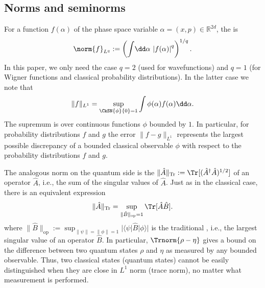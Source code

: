 \documentclass{article}
\numberwithin{equation}{section}
\begin{document}
\subsection{Norms and seminorms}\label{sec:norms}



For a function $f(\alpha)$ of the phase space variable $\alpha = (x,p) \in \mathbb{R}^{2d}$, the  is
\begin{align}
    \norm{f}_{L^q} := \left( \int \!\dd \alpha\, \left|f(\alpha)\right|^q\right)^{1/q}.
\end{align}
In this paper, we only need the case $q=2$ (used for 
wavefunctions) and $q=1$ (for Wigner functions and classical
probability distributions).  In the latter case we note that
\begin{equation} \label{eq:Lonenorm-variational-defn}
     \|f\|_{L^1} 
    = \sup_{\CkSN{\phi}{0}=1} 
    \int \phi(\alpha)f(\alpha)\dd\alpha.
\end{equation}
The supremum is over continuous functions $\phi$ bounded by $1$.
In particular, for probability distributions $f$ and $g$ 
the error 
$\|f-g\|_{L^1}$ represents the largest possible discrepancy
of a bounded classical observable $\phi$ with respect to the 
probability distributions $f$ and $g$. 

The analogous norm on the quantum side is the  $\|\hat{A}\|_{\mathrm{Tr}} := \Tr[(\hat{A}^\dagger \hat{A})^{1/2}]$ of an operator $\hat{A}$, i.e., the sum of the singular values of $\hat{A}$. Just as in the classical case, there is an equivalent expression
\begin{equation}\label{eq:tracenorm-variational-defn}
\|\hat{A}\|_{\mathrm{Tr}} = \sup_{\|\hat{B}\|_{\mathrm{op}}=1} \Tr[\hat{A} \hat{B}].
\end{equation}
where $\|\hat{B}\|_{\mathrm{op}} := \sup_{\|\psi\| = \|\phi\| = 1} |\langle \psi|\hat{B}|\phi\rangle|$ is the traditional , i.e., the largest singular value of an operator $\hat{B}$.  In particular, $\Trnorm{\rho-\eta}$ gives a bound on the difference between two quantum states $\rho$ and $\eta$ as measured by any bounded observable. Thus, two classical states (quantum states) cannot be easily distinguished when they are close in $L^1$ norm (trace norm), no matter what measurement is performed.
 
\end{document}
